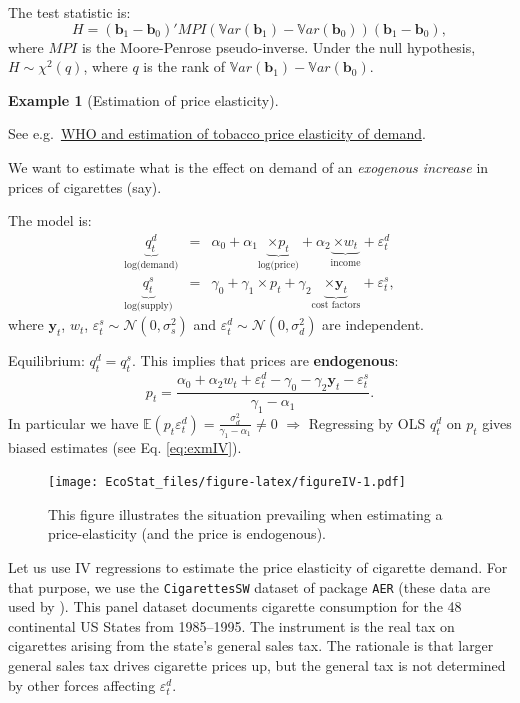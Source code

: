 \documentclass[
  12pt,
]{book}
\theoremstyle{definition}
\theoremstyle{definition}
\newtheorem{example}{Example}[chapter]
\theoremstyle{definition}
\theoremstyle{definition}
\theoremstyle{remark}
\begin{document}
The test statistic is:
\[
H = (\mathbf{b}_1 - \mathbf{b}_0)' MPI(\mathbb{V}ar(\mathbf{b}_1) - \mathbb{V}ar(\mathbf{b}_0))(\mathbf{b}_1 - \mathbf{b}_0),
\]
where \(MPI\) is the Moore-Penrose pseudo-inverse. Under the null hypothesis, \(H \sim \chi^2(q)\), where \(q\) is the rank of \(\mathbb{V}ar(\mathbf{b}_1) - \mathbb{V}ar(\mathbf{b}_0)\).

\begin{example}[Estimation of price elasticity]
\protect\hypertarget{exm:priceElasticity}{}\label{exm:priceElasticity}

See e.g.~\href{http://www.who.int/tobacco/economics/2_2estimatingpriceincomeelasticities.pdf?ua=1}{WHO and estimation of tobacco price elasticity of demand}.

We want to estimate what is the effect on demand of an \emph{exogenous increase} in prices of cigarettes (say).

The model is:
\begin{eqnarray*}
\underbrace{q^d_t}_{\mbox{log(demand)}} &=& \alpha_0 + \alpha_1 \underbrace{\times p_t}_{\mbox{log(price)}} + \alpha_2 \underbrace{\times w_t}_{\mbox{income}} + \varepsilon_t^d\\
\underbrace{q^s_t}_{\mbox{log(supply)}} &=& \gamma_0 + \gamma_1 \times p_t + \gamma_2 \underbrace{\times \mathbf{y}_t}_{\mbox{cost factors}} + \varepsilon_t^s,
\end{eqnarray*}
where \(\mathbf{y}_t\), \(w_t\), \(\varepsilon_t^s \sim \mathcal{N}(0,\sigma^2_s)\) and \(\varepsilon_t^d \sim \mathcal{N}(0,\sigma^2_d)\) are independent.

Equilibrium: \(q^d_t = q^s_t\). This implies that prices are \textbf{endogenous}:
\[
p_t = \frac{\alpha_0 + \alpha_2 w_t + \varepsilon_t^d - \gamma_0 - \gamma_2 \mathbf{y}_t - \varepsilon_t^s}{\gamma_1 - \alpha_1}.
\]
In particular we have \(\mathbb{E}(p_t \varepsilon_t^d) = \frac{\sigma^2_d}{\gamma_1 - \alpha_1} \ne 0\) \(\Rightarrow\) Regressing by OLS \(q_t^d\) on \(p_t\) gives biased estimates (see Eq. \eqref{eq:exmIV}).

\begin{figure}
\centering
\texttt{[image: EcoStat\_files/figure-latex/figureIV-1.pdf]}
\caption{\label{fig:figureIV}This figure illustrates the situation prevailing when estimating a price-elasticity (and the price is endogenous).}
\end{figure}

Let us use IV regressions to estimate the price elasticity of cigarette demand. For that purpose, we use the \texttt{CigarettesSW} dataset of package \texttt{AER} (these data are used by \citet{Stock_Watson_2003}). This panel dataset documents cigarette consumption for the 48 continental US States from 1985--1995. The instrument is the real tax on cigarettes arising from the state's general sales tax. The rationale is that larger general sales tax drives cigarette prices up, but the general tax is not determined by other forces affecting \(\varepsilon_t^d\).


\end{example}
\end{document}
